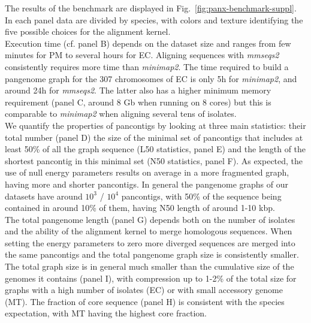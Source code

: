 \documentclass[aps,rmp,reprint,superscriptaddress,notitlepage,10pt,onecolumn]{revtex4-1}
\begin{document}
The results of the benchmark are displayed in Fig.~\ref{fig:panx-benchmark-suppl}. In each panel data are divided by species, with colors and texture identifying the five possible choices for the alignment kernel.\\
Execution time (cf. panel B) depends on the dataset size and ranges from few minutes for PM to several hours for EC. Aligning sequences with \textit{mmseqs2} consistently requires more time than \textit{minimap2}. The time required to build a pangenome graph for the 307 chromosomes of EC is only 5h for \textit{minimap2}, and around 24h for \textit{mmseqs2}. The latter also has a higher minimum memory requirement (panel C, around 8 Gb when running on 8 cores) but this is comparable to \textit{minimap2} when aligning several tens of isolates.\\
We quantify the properties of pancontigs by looking at three main statistics: their total number (panel D) the size of the minimal set of pancontigs that includes at least 50\% of all the graph sequence (L50 statistics, panel E) and the length of the shortest pancontig in this minimal set (N50 statistics, panel F). As expected, the use of null energy parameters results on average in a more fragmented graph, having more and shorter pancontigs. In general the pangenome graphs of our datasets have around $10^3$ / $10^4$ pancontigs, with 50\% of the sequence being contained in around 10\% of them, having N50 length of around 1-10 kbp.\\
The total pangenome length (panel G) depends both on the number of isolates and the ability of the alignment kernel to merge homologous sequences. When setting the energy parameters to zero more diverged sequences are merged into the same pancontigs and the total pangenome graph size is consistently smaller. The total graph size is in general much smaller than the cumulative size of the genomes it contains (panel I), with compression up to 1-2\% of the total size for graphs with a high number of isolates (EC) or with small accessory genome (MT). The fraction of core sequence (panel H) is consistent with the species expectation, with MT having the highest core fraction.\\
\end{document}
